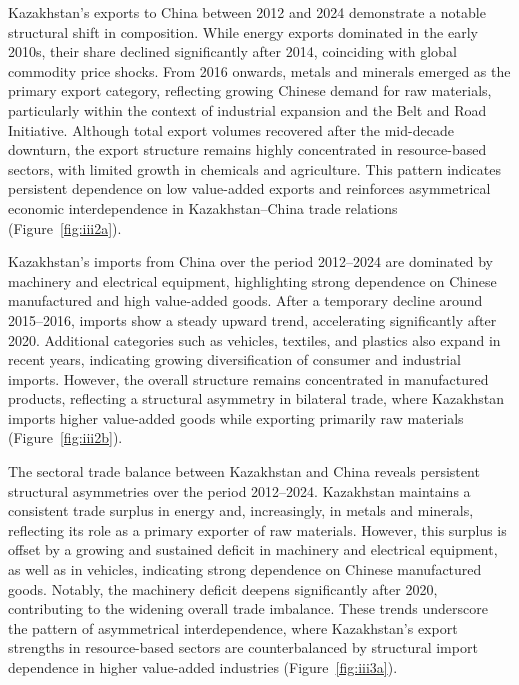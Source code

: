 \documentclass[12pt]{article}
\begin{document}
Kazakhstan’s exports to China between 2012 and 2024 demonstrate a notable structural shift in composition. While energy exports dominated in the early 2010s, their share declined significantly after 2014, coinciding with global commodity price shocks. From 2016 onwards, metals and minerals emerged as the primary export category, reflecting growing Chinese demand for raw materials, particularly within the context of industrial expansion and the Belt and Road Initiative. Although total export volumes recovered after the mid-decade downturn, the export structure remains highly concentrated in resource-based sectors, with limited growth in chemicals and agriculture. This pattern indicates persistent dependence on low value-added exports and reinforces asymmetrical economic interdependence in Kazakhstan--China trade relations (Figure~\ref{fig:iii2a}).\par

Kazakhstan’s imports from China over the period 2012--2024 are dominated by machinery and electrical equipment, highlighting strong dependence on Chinese manufactured and high value-added goods. After a temporary decline around 2015--2016, imports show a steady upward trend, accelerating significantly after 2020. Additional categories such as vehicles, textiles, and plastics also expand in recent years, indicating growing diversification of consumer and industrial imports. However, the overall structure remains concentrated in manufactured products, reflecting a structural asymmetry in bilateral trade, where Kazakhstan imports higher value-added goods while exporting primarily raw materials (Figure~\ref{fig:iii2b}).\par

The sectoral trade balance between Kazakhstan and China reveals persistent structural asymmetries over the period 2012--2024. Kazakhstan maintains a consistent trade surplus in energy and, increasingly, in metals and minerals, reflecting its role as a primary exporter of raw materials. However, this surplus is offset by a growing and sustained deficit in machinery and electrical equipment, as well as in vehicles, indicating strong dependence on Chinese manufactured goods. Notably, the machinery deficit deepens significantly after 2020, contributing to the widening overall trade imbalance. These trends underscore the pattern of asymmetrical interdependence, where Kazakhstan’s export strengths in resource-based sectors are counterbalanced by structural import dependence in higher value-added industries (Figure~\ref{fig:iii3a}).\par
\end{document}
